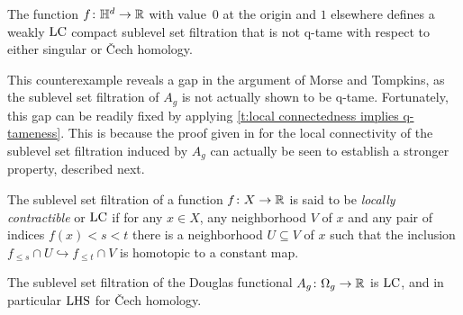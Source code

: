 %

\begin{cor} \label{c:counterexample}
	The function $f \colon \mathbb{H}^d \to \mathbb{R}$ with value~$0$ at the origin and $1$ elsewhere defines a weakly $\mathrm{LC}$ compact sublevel set filtration that is not q-tame with respect to either singular or \v{C}ech homology.
\end{cor}

This counterexample reveals a gap in the argument of Morse and Tompkins, as the sublevel set filtration of $A_g$ is not actually shown to be q-tame.
Fortunately, this gap can be readily fixed by applying \cref{t:local connectedness implies q-tameness}.
This is because the proof given in \cite[Theorem 7.2, p.464]{Morse.1939} for the local connectivity of the sublevel set filtration induced by $A_g$ can actually be seen to establish a stronger property, described next.

\begin{defi}
	The sublevel set filtration of a function $f \colon X \to \mathbb{R}$ is said to be \emph{locally contractible} or \emph{$\mathrm{LC}$} if for any $x \in X$, any neighborhood $V$ of $x$ and any pair of indices $f(x) < s < t$ there is a neighborhood $U \subseteq V$ of $x$ such that the inclusion $f_{\leq s} \cap U \hookrightarrow f_{\leq t} \cap V$ is homotopic to a constant map.
\end{defi}

\begin{prop}
\label{prop:douglas_hlc}
    The sublevel set filtration of the Douglas functional $A_g \colon \Omega_g \to \mathbb{R}$ is $\mathrm{LC}$, and in particular $\mathrm{LHS}$ for \v{C}ech homology.
\end{prop}
%

